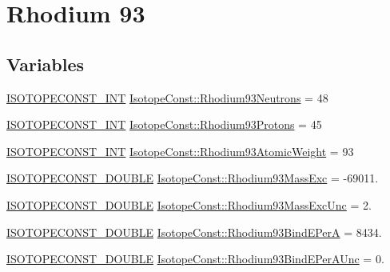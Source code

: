 \hypertarget{group___isotope_const-_rhodium-_rh93}{}\section{Rhodium 93}
\label{group___isotope_const-_rhodium-_rh93}
\subsection*{Variables}
\begin{DoxyCompactItemize}
\item 
\mbox{\hyperlink{group___isotope_const-_macros_ga5f18360b3e99483a35c32d789e62621c}{I\+S\+O\+T\+O\+P\+E\+C\+O\+N\+S\+T\+\_\+\+I\+NT}} \mbox{\hyperlink{group___isotope_const-_rhodium-_rh93_ga6543b3c101ba3b6d45782ac2b681518c}{Isotope\+Const\+::\+Rhodium93\+Neutrons}} = 48
\item 
\mbox{\hyperlink{group___isotope_const-_macros_ga5f18360b3e99483a35c32d789e62621c}{I\+S\+O\+T\+O\+P\+E\+C\+O\+N\+S\+T\+\_\+\+I\+NT}} \mbox{\hyperlink{group___isotope_const-_rhodium-_rh93_gae026cbd4a4625d2a73fcce1ad8e92dee}{Isotope\+Const\+::\+Rhodium93\+Protons}} = 45
\item 
\mbox{\hyperlink{group___isotope_const-_macros_ga5f18360b3e99483a35c32d789e62621c}{I\+S\+O\+T\+O\+P\+E\+C\+O\+N\+S\+T\+\_\+\+I\+NT}} \mbox{\hyperlink{group___isotope_const-_rhodium-_rh93_gacc2c9017de163eda88f57500b1cc8405}{Isotope\+Const\+::\+Rhodium93\+Atomic\+Weight}} = 93
\item 
\mbox{\hyperlink{group___isotope_const-_macros_ga8f45a7272ce02c0b4c65c44636ed719a}{I\+S\+O\+T\+O\+P\+E\+C\+O\+N\+S\+T\+\_\+\+D\+O\+U\+B\+LE}} \mbox{\hyperlink{group___isotope_const-_rhodium-_rh93_ga38f695a355fe22836db836e31cd5a42f}{Isotope\+Const\+::\+Rhodium93\+Mass\+Exc}} = -\/69011.
\item 
\mbox{\hyperlink{group___isotope_const-_macros_ga8f45a7272ce02c0b4c65c44636ed719a}{I\+S\+O\+T\+O\+P\+E\+C\+O\+N\+S\+T\+\_\+\+D\+O\+U\+B\+LE}} \mbox{\hyperlink{group___isotope_const-_rhodium-_rh93_gabdbdbb5724cbc00f47cb3b867b52224c}{Isotope\+Const\+::\+Rhodium93\+Mass\+Exc\+Unc}} = 2.
\item 
\mbox{\hyperlink{group___isotope_const-_macros_ga8f45a7272ce02c0b4c65c44636ed719a}{I\+S\+O\+T\+O\+P\+E\+C\+O\+N\+S\+T\+\_\+\+D\+O\+U\+B\+LE}} \mbox{\hyperlink{group___isotope_const-_rhodium-_rh93_ga74b4944596256e68ac8da4a5188afdf3}{Isotope\+Const\+::\+Rhodium93\+Bind\+E\+PerA}} = 8434.
\item 
\mbox{\hyperlink{group___isotope_const-_macros_ga8f45a7272ce02c0b4c65c44636ed719a}{I\+S\+O\+T\+O\+P\+E\+C\+O\+N\+S\+T\+\_\+\+D\+O\+U\+B\+LE}} \mbox{\hyperlink{group___isotope_const-_rhodium-_rh93_ga6626adc30206b301b1f06aafbbcd735e}{Isotope\+Const\+::\+Rhodium93\+Bind\+E\+Per\+A\+Unc}} = 0.

\end{DoxyCompactItemize}
